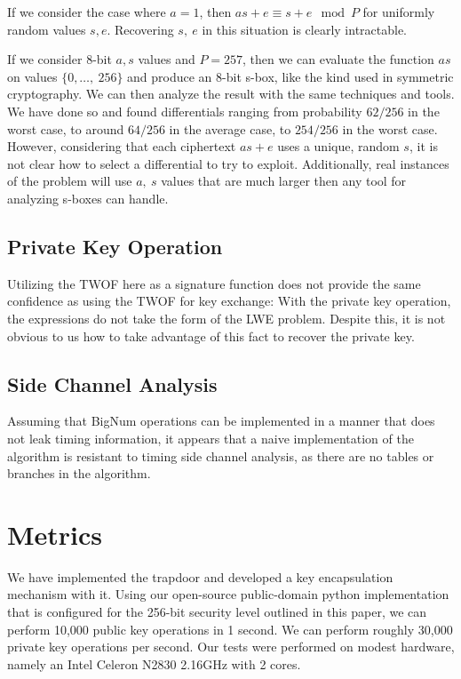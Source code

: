 \documentclass[preprint]{iacrtrans}
\begin{document}
If we consider the case where $a = 1$, then $a s + e \equiv s + e \mod P$ for uniformly random values $s, e$. Recovering $s,\ e$ in this situation is clearly intractable.

If we consider 8-bit $a, s$ values and $P = 257$, then we can evaluate the function $a s$ on values $\{0,\dots,\ 256\}$ and produce an 8-bit s-box, like the kind used in symmetric cryptography. We can then analyze the result with the same techniques and tools. We have done so and found differentials ranging from probability $62/256$ in the worst case, to around $64/256$ in the average case, to $254/256$ in the worst case. However, considering that each ciphertext $a s + e$ uses a unique, random $s$, it is not clear how to select a differential to try to exploit. Additionally, real instances of the problem will use $a,\ s$ values that are much larger then any tool for analyzing s-boxes can handle.

\subsection{Private Key Operation}
Utilizing the TWOF here as a signature function does not provide the same confidence as using the TWOF for key exchange: With the private key operation, the expressions do not take the form of the LWE problem. Despite this, it is not obvious to us how to take advantage of this fact to recover the private key.

\subsection{Side Channel Analysis}
Assuming that BigNum operations can be implemented in a manner that does not leak timing information, it appears that a naive implementation of the algorithm is resistant to timing side channel analysis, as there are no tables or branches in the algorithm.

\section{Metrics}
We have implemented the trapdoor and developed a key encapsulation mechanism with it. Using our open-source public-domain python implementation that is configured for the 256-bit security level outlined in this paper, we can perform 10,000 public key operations in 1 second. We can perform roughly 30,000 private key operations per second. Our tests were performed on modest hardware, namely an Intel Celeron N2830 2.16GHz with 2 cores. 
\end{document}
